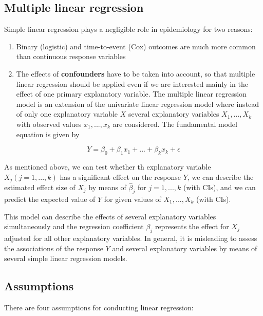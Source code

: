 \documentclass[
]{book}
\providecommand{\tightlist}{%
  \setlength{\itemsep}{0pt}\setlength{\parskip}{0pt}}
\begin{document}
\hypertarget{multiple-linear-regression}{%
\subsection{Multiple linear regression}\label{multiple-linear-regression}}

Simple linear regression plays a negligible role in epidemiology for two reasons:

\begin{enumerate}
\def\labelenumi{\arabic{enumi}.}
\tightlist
\item
  Binary (logistic) and time-to-event (Cox) outcomes are much more common than continuous response variables
\item
  The effects of \textbf{confounders} have to be taken into account, so that multiple linear regression should be applied even if we are interested mainly in the effect of one primary explanatory variable. The multiple linear regression model is an extension of the univariate linear regression model where instead of only one explanatory variable \(X\) several explanatory variables \(X_1,...,X_k\) with observed values \(x_1,...,x_k\) are considered. The fundamental model equation is given by
\end{enumerate}

\[
Y = \beta_0 + \beta_1 x_1 + ... + \beta_k x_k + \epsilon
\]

As mentioned above, we can test whether th explanatory variable \(X_j (j=1, ..., k)\) has a significant effect on the response \(Y\), we can describe the estimated effect size of \(X_j\) by means of \(\hat{\beta}_j\) for \(j=1,...,k\) (with CIs), and we can predict the expected value of \(Y\) for given values of \(X_1, ..., X_k\) (with CIs).

This model can describe the effects of several explanatory variables simultaneously and the regression coefficient \(\beta_j\) represents the effect for \(X_j\) adjusted for all other explanatory variables. In general, it is misleading to assess the associations of the response \(Y\) and several explanatory variables by means of several simple linear regression models.

\hypertarget{assumptions}{%
\subsection{Assumptions}\label{assumptions}}

There are four assumptions for conducting linear regression:
\end{document}
